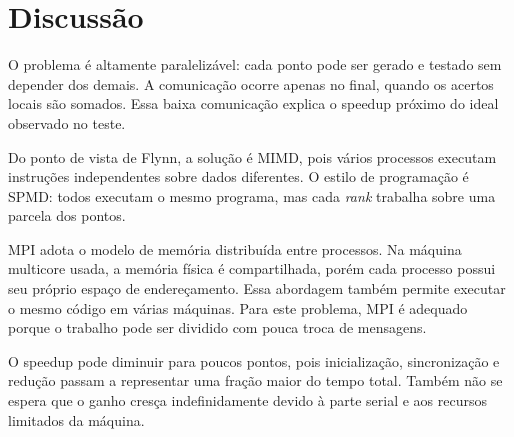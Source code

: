 \section{Discussão}

O problema é altamente paralelizável: cada ponto pode ser gerado e testado
sem depender dos demais. A comunicação ocorre apenas no final, quando os
acertos locais são somados. Essa baixa comunicação explica o speedup próximo
do ideal observado no teste.

Do ponto de vista de Flynn, a solução é MIMD, pois vários processos executam
instruções independentes sobre dados diferentes. O estilo de programação é
SPMD: todos executam o mesmo programa, mas cada \textit{rank} trabalha sobre
uma parcela dos pontos.

MPI adota o modelo de memória distribuída entre processos. Na máquina
multicore usada, a memória física é compartilhada, porém cada processo possui
seu próprio espaço de endereçamento. Essa abordagem também permite executar o
mesmo código em várias máquinas. Para este problema, MPI é adequado porque o
trabalho pode ser dividido com pouca troca de mensagens.

O speedup pode diminuir para poucos pontos, pois inicialização, sincronização
e redução passam a representar uma fração maior do tempo total. Também não se
espera que o ganho cresça indefinidamente devido à parte serial e aos recursos
limitados da máquina.
